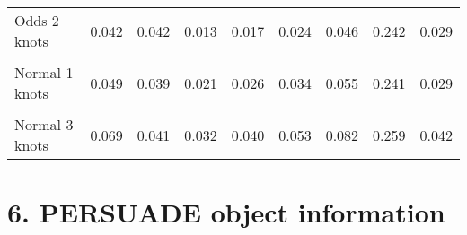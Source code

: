 \documentclass[
]{article}
\begin{document}
\begin{table}[H]
{\begin{tabular}[t]{lrrrrrrrr}
Odds 2 knots & 0.042 & 0.042 & 0.013 & 0.017 & 0.024 & 0.046 & 0.242 & 0.029\\
\cellcolor{gray!10}{Odds 3 knots} & \cellcolor{gray!10}{0.048} & \cellcolor{gray!10}{0.045} & \cellcolor{gray!10}{0.015} & \cellcolor{gray!10}{0.020} & \cellcolor{gray!10}{0.029} & \cellcolor{gray!10}{0.056} & \cellcolor{gray!10}{0.258} & \cellcolor{gray!10}{0.036}\\
Normal 1 knots & 0.049 & 0.039 & 0.021 & 0.026 & 0.034 & 0.055 & 0.241 & 0.029\\
\cellcolor{gray!10}{Normal 2 knots} & \cellcolor{gray!10}{0.053} & \cellcolor{gray!10}{0.040} & \cellcolor{gray!10}{0.023} & \cellcolor{gray!10}{0.028} & \cellcolor{gray!10}{0.037} & \cellcolor{gray!10}{0.060} & \cellcolor{gray!10}{0.237} & \cellcolor{gray!10}{0.032}\\
Normal 3 knots & 0.069 & 0.041 & 0.032 & 0.040 & 0.053 & 0.082 & 0.259 & 0.042\\
\bottomrule
\end{tabular}}
\end{table}

\clearpage

\section{6. PERSUADE object
information}\label{persuade-object-information}
\end{document}
